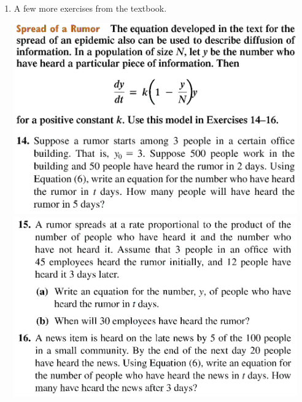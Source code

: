 \begin{enumerate}
    \newpage

    \item %
        A few more exercises from the textbook.
        \begin{center}
            \includegraphics[width=0.96\textwidth]{screenshots/rumor-1.png}
            \includegraphics[width=0.96\textwidth]{screenshots/rumor-2.png}
        \end{center}

    \newpage


\end{enumerate}
